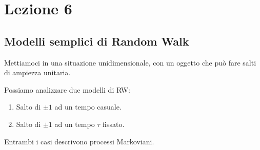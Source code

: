 \section{Lezione 6}%
\label{sub:Lezione 6}

\subsection{Modelli semplici di Random Walk}%
\label{sub:Random Walk}

Mettiamoci in una situazione unidimensionale, con un oggetto che può fare salti di ampiezza unitaria.

Possiamo analizzare due modelli di RW:
\begin{enumerate}
    \item Salto di $\pm 1$ ad un tempo casuale.
    \item Salto di $\pm 1$ ad un tempo $\tau$ fissato.
\end{enumerate}
Entrambi i casi descrivono processi Markoviani.
